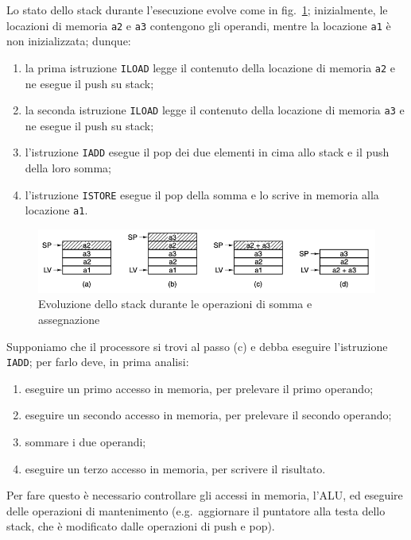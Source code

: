 \documentclass[a4paper,12pt]{scrreprt}
\begin{document}
Lo stato dello stack durante l'esecuzione evolve come in
fig.~\ref{fig:stack_add}; inizialmente, le locazioni di memoria \lstinline{a2} e
\lstinline{a3} contengono gli operandi, mentre la locazione \lstinline{a1} è non
inizializzata; dunque:
\renewcommand{\labelenumi}{(\alph{enumi})}
\begin{enumerate}
  \item la prima istruzione \lstinline{ILOAD} legge il contenuto della locazione
  di memoria \lstinline{a2} e ne esegue il push su stack;
  \item la seconda istruzione \lstinline{ILOAD} legge il contenuto della
  locazione di memoria \lstinline{a3} e ne esegue il push su stack;
  \item l'istruzione \lstinline{IADD} esegue il pop dei due elementi in cima
  allo stack e il push della loro somma;
  \item l'istruzione \lstinline{ISTORE} esegue il pop della somma e lo scrive in
  memoria alla locazione \lstinline{a1}.
\end{enumerate}
\renewcommand{\labelenumi}{\arabic{enumi}.}

\begin{figure}
  \centering
  \includegraphics[width=\textwidth]{stack_add.png}
  \caption{Evoluzione dello stack durante le operazioni di somma e
    assegnazione}\label{fig:stack_add}
\end{figure}

Supponiamo che il processore si trovi al passo (c) e debba eseguire l'istruzione
\lstinline{IADD}; per farlo deve, in prima analisi:
\begin{enumerate}
  \item eseguire un primo accesso in memoria, per prelevare il primo operando;
  \item eseguire un secondo accesso in memoria, per prelevare il secondo
  operando;
  \item sommare i due operandi;
  \item eseguire un terzo accesso in memoria, per scrivere il risultato.
\end{enumerate}

Per fare questo è necessario controllare gli accessi in memoria, l'ALU, ed
eseguire delle operazioni di mantenimento (e.g.~aggiornare il puntatore alla
testa dello stack, che è modificato dalle operazioni di push e pop).
\end{document}
